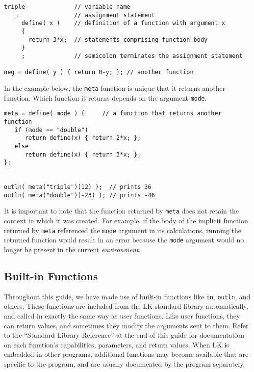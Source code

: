 \documentclass{article}
\begin{document}
\begin{verbatim}
triple              // variable name
   =                // assignment statement
     define( x )    // definition of a function with argument x
     {              
       return 3*x;  // statements comprising function body
     }        
     ;              // semicolon terminates the assignment statement
     
neg = define( y ) { return 0-y; }; // another function
\end{verbatim}

In the example below, the \texttt{meta} function is unique that it returns another function.  Which function it returns depends on the argument \texttt{mode}.

\begin{verbatim}
meta = define( mode ) {     // a function that returns another function
   if (mode == "double")
      return define(x) { return 2*x; };
   else
      return define(x) { return 3*x; };
};


outln( meta("triple")(12) );  // prints 36
outln( meta("double")(-23) ); // prints -46

\end{verbatim}

It is important to note that the function returned by \texttt{meta} does not retain the context in which it was created.  For example, if the body of the implicit function returned by \texttt{meta} referenced the \texttt{mode} argument in its calculations, running the returned function would result in an error because the \texttt{mode} argument would no longer be present in the current \emph{environment}.

\subsection{Built-in Functions}

Throughout this guide, we have made use of built-in functions like \texttt{in}, \texttt{outln}, and others.  These functions are included from the LK standard library automatically, and called in exactly the same way as user functions.  Like user functions, they can return values, and sometimes they modify the arguments sent to them.  Refer to the ``Standard Library Reference'' at the end of this guide for documentation on each function's capabilities, parameters, and return values.  When LK is embedded in other programs, additional functions may become available that are specific to the program, and are usually documented by the program separately.
\end{document}
